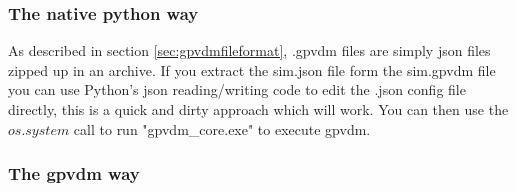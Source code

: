 \subsubsection{The native python way}
As described in section \ref{sec:gpvdmfileformat}, .gpvdm files are simply json files zipped up in an archive. If you extract the sim.json file form the sim.gpvdm file you can use Python's json reading/writing code to edit the .json config file directly, this is a quick and dirty approach which will work. You can then use the $os.system$ call to run "gpvdm\_core.exe" to execute gpvdm.
\subsubsection{The gpvdm way}

\label{sec:pythonscripts}


